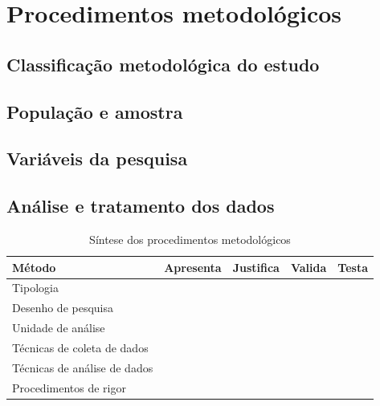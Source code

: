 \section{Procedimentos metodológicos}
\label{sec:metodo}
\aescrever


\subsection{Classificação metodológica do estudo}
\aescrever


\subsection{População e amostra}
\aescrever


\subsection{Variáveis da pesquisa}
\aescrever


\subsection{Análise e tratamento dos dados}
\aescrever


\begin{table}[htbp]
  \caption{Síntese dos procedimentos metodológicos}
  \label{tab:sintese-metodo}
  \begin{tabularx}{\textwidth}{l X X X X}
    \toprule
    \textbf{Método} & \textbf{Apresenta} & \textbf{Justifica} & \textbf{Valida} & \textbf{Testa} \\
    \midrule
    Tipologia                    & & & & \\
    Desenho de pesquisa          & & & & \\
    Unidade de análise           & & & & \\
    Técnicas de coleta de dados  & & & & \\
    Técnicas de análise de dados & & & & \\
    Procedimentos de rigor       & & & & \\
    \bottomrule
  \end{tabularx}
\end{table}
